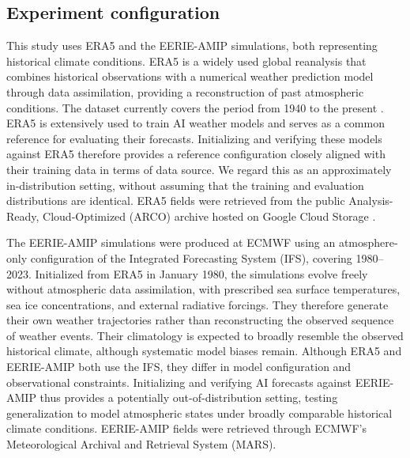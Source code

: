 \subsection{Experiment configuration} \label{experiment-configuration}

This study uses ERA5 and the EERIE-AMIP simulations, both representing historical climate conditions. ERA5 \citep{hersbach_era5_2020} is a widely used global reanalysis that combines historical observations with a numerical weather prediction model through data assimilation, providing a reconstruction of past atmospheric conditions. The dataset currently covers the period from 1940 to the present \citep{soci_era5_2024}. ERA5 is extensively used to train AI weather models and serves as a common reference for evaluating their forecasts. Initializing and verifying these models against ERA5 therefore provides a reference configuration closely aligned with their training data in terms of data source. We regard this as an approximately in-distribution setting, without assuming that the training and evaluation distributions are identical. ERA5 fields were retrieved from the public Analysis-Ready, Cloud-Optimized (ARCO) archive hosted on Google Cloud Storage \citep{carver_arco-era5_2023}.

The EERIE-AMIP simulations \citep{aengenheyster_multi-decadal_2026} were produced at ECMWF using an atmosphere-only configuration of the Integrated Forecasting System (IFS), covering 1980--2023. Initialized from ERA5 in January 1980, the simulations evolve freely without atmospheric data assimilation, with prescribed sea surface temperatures, sea ice concentrations, and external radiative forcings. They therefore generate their own weather trajectories rather than reconstructing the observed sequence of weather events. Their climatology is expected to broadly resemble the observed historical climate, although systematic model biases remain. Although ERA5 and EERIE-AMIP both use the IFS, they differ in model configuration and observational constraints. Initializing and verifying AI forecasts against EERIE-AMIP thus provides a potentially out-of-distribution setting, testing generalization to model atmospheric states under broadly comparable historical climate conditions. EERIE-AMIP fields were retrieved through ECMWF's Meteorological Archival and Retrieval System (MARS).

